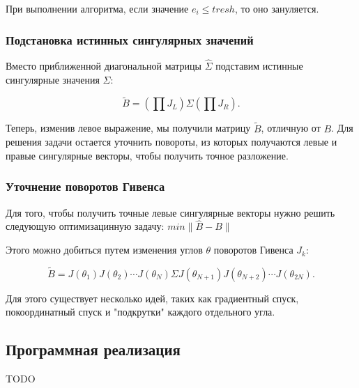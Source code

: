 При выполнении алгоритма, если значение \(e_i \le tresh\), то оно зануляется.

\subsubsection{Подстановка истинных сингулярных значений}

Вместо приближенной диагональной матрицы \( \widehat{\Sigma} \) подставим истинные сингулярные значения \( \Sigma \):

\begin{equation}
\tilde{B} = \left( \prod J_L \right) \Sigma \left( \prod J_R \right).
\end{equation}

Теперь, изменив левое выражение, мы получили матрицу $\tilde{B}$, отличную от $B$. Для решения задачи остается уточнить повороты, из которых получаются левые и правые сингулярные векторы, чтобы получить точное разложение.

\subsubsection{Уточнение поворотов Гивенса}

Для того, чтобы получить точные левые сингулярные векторы нужно решить следующую оптимизацинную задачу:
\( 
min\| \widehat{B} - B \| 
\)

Этого можно добиться путем изменения углов \( \theta \) поворотов Гивенса \( J_k \):

\begin{equation}
\tilde{B} = J(\theta_1) J(\theta_2) \cdots J(\theta_N) \Sigma J(\theta_{N+1}) J(\theta_{N+2}) \cdots J(\theta_{2N}).
\end{equation}

Для этого существует несколько идей, таких как градиентный спуск, покоординатный спуск и "подкрутки" каждого отдельного угла.

\subsection{Программная реализация}

TODO






